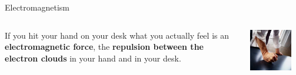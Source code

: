 \begin{frame}{Electromagnetism}

\begin{columns}
  \begin{column}{0.50\textwidth}
  {
     If you hit your hand on your desk what you actually feel is an {\bf electromagnetic force},
     the {\bf repulsion between the electron clouds} in your hand and in your desk.\\
  }
  \end{column}
  \begin{column}{0.50\textwidth}
   \begin{center}
     \includegraphics[width=0.80\textwidth]{./images/misc/hit_hand_on_desk.jpg}\\
   \end{center}
  \end{column}
\end{columns}

\end{frame}

%
%
%

